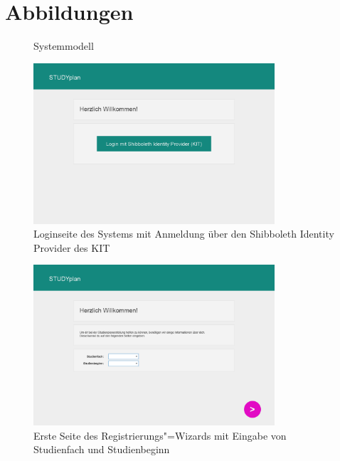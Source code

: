\FloatBarrier
\section{Abbildungen}
\begin{figure}[!h]
	\caption{Systemmodell}
	\label{system_model:overview}
	\resizebox{\textwidth}{!} {
		
	}
\end{figure}
\begin{figure}[!h]
	\caption{Loginseite des Systems mit Anmeldung über den \gls{Shibboleth Identity Provider} des \gls{KIT}}
	\label{fig:gui-login-1}
	\centering
	\includegraphics[width=0.8\textwidth]{../GUI/ergebnisse/login-1.png}
\end{figure}
\begin{figure}[!h]
	\caption{Erste Seite des Registrierungs"=\gls{Wizard}s mit Eingabe von Studienfach und Studienbeginn}
	\label{fig:gui-registrierung-1}
	\centering
	\includegraphics[width=0.8\textwidth]{../GUI/ergebnisse/registrierung-1.png}
\end{figure}


